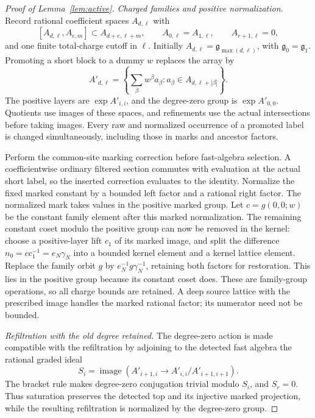 \documentclass[11pt,a4paper]{article}
\theoremstyle{definition}
\newcommand{\g}{\mathfrak g}
\newcommand{\im}{\operatorname{image}}
\begin{document}
\begin{proof}[Proof of Lemma~\ref{lem:active}]
\textit{Charged families and positive normalization.}
Record rational coefficient spaces \(A_{d,\ell}\) with
\[
 [A_{d,\ell},A_{e,m}]\subset A_{d+e,\ell+m},\qquad
 A_{0,\ell}=A_{1,\ell},\qquad A_{r+1,\ell}=0,
\]
and one finite total-charge cutoff in \(\ell\).
Initially \(A_{d,\ell}=\g_{\max(d,\ell)}\), with
\(\g_0=\g_1\). Promoting a short block to a dummy \(w\) replaces
the array by
\begin{equation}\label{eq:family}
 A'_{d,\ell}
   =\left\{\sum_\beta w^\beta a_\beta:
                 a_\beta\in A_{d,\ell+|\beta|}\right\}.
\end{equation}
The positive layers are \(\exp A'_{i,i}\), and the
degree-zero group is \(\exp A'_{0,0}\). Quotients use images
of these spaces, and refinements use the actual intersections
before taking images. Every raw and normalized occurrence of a
promoted label is changed simultaneously, including those in
marks and ancestor factors.

Perform the common-site marking correction before fast-algebra
selection. A coefficientwise ordinary filtered section commutes
with evaluation at the actual short label, so the inserted
correction evaluates to the identity. Normalize the fixed marked
constant by a bounded left factor and a rational right factor.
The normalized mark takes values in the positive marked group.
Let \(c=g(0,0;w)\) be the constant family element after this
marked normalization.
The remaining constant coset modulo the positive group can now
be removed in the kernel: choose a positive-layer lift \(c_1\)
of its marked image, and split the difference
\(n_0=cc_1^{-1}=e_N\gamma_N\) into a bounded kernel element
and a kernel lattice element. Replace the family orbit \(g\) by
\(e_N^{-1}g\gamma_N^{-1}\), retaining both factors for restoration.
This lies in the positive group because its constant coset
does. These are family-group operations, so all charge bounds
are retained. A deep source lattice with the prescribed image
handles the marked rational factor; its numerator need not be
bounded.

\textit{Refiltration with the old degree retained.}
The degree-zero action is made compatible with the refiltration
by adjoining to the detected fast algebra the rational graded
ideal
\[
 S_i=\im\!\left(A'_{i+1,i}\longrightarrow
                    A'_{i,i}/A'_{i+1,i+1}\right).
\]
The bracket rule makes degree-zero conjugation trivial modulo
\(S_i\), and \(S_r=0\). Thus saturation preserves the detected
top and its injective marked projection, while the resulting
refiltration is normalized by the degree-zero group.


\end{proof}
\end{document}
